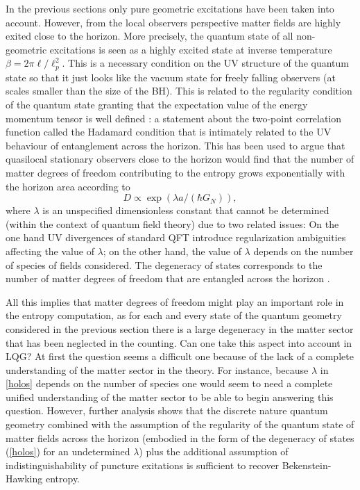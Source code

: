 \documentclass[aps, nofootinbib,superscriptaddress,12pt]{revtex4-2}
\def\be{\begin{equation}}
\def\ee{\end{equation}}
\begin{document}
In the previous sections only pure geometric excitations have been taken into account.
However, from the local observers perspective matter fields are highly exited close to the horizon.
More precisely, the quantum state of all non-geometric excitations is seen as a highly excited state at inverse temperature $\beta=2\pi \ell/\ell_p^2$.  This is a necessary condition on the UV structure of the quantum state so that it just looks like the vacuum state  for freely falling observers (at scales smaller than the size of the BH). This is related to the regularity condition of the quantum state granting that the expectation value of the energy momentum tensor is well defined \cite{Wald:1995yp}: a statement about the two-point correlation function called the Hadamard condition that is intimately related to the UV behaviour of entanglement across the horizon.  This has been used to argue \cite{tHooft:1984kcu} that  quasilocal stationary observers close to the horizon would find that the number of matter degrees of freedom contributing to the entropy grows exponentially with the horizon area according to 
\be\label{holos}
D \propto \exp(\lambda a/(\hbar G_N)),
\ee
where $\lambda$ is an unspecified dimensionless constant that cannot be determined (within the context of quantum field theory) due to two related issues:
On the one hand UV divergences of standard QFT introduce regularization ambiguities affecting the value of $\lambda$; on the other hand, the value of $\lambda$ depends on the number of species of fields considered. The degeneracy of states corresponds to the number of matter degrees of freedom that are entangled across the horizon \cite{Solodukhin:2011gn}. 

All this implies that matter degrees of freedom might play an important role in the entropy computation, as
for each and every state of the quantum geometry considered in the previous section there is a large degeneracy in the matter sector that has been neglected in the counting. Can one take this aspect into account in LQG?
At first the question seems a difficult one because of the lack of a complete understanding of the matter sector in the theory. For instance, because $\lambda$ in \eqref{holos} depends on the number of species one would seem to need a complete unified understanding of the matter sector to be able to begin answering this question.
However, further analysis shows \cite{Ghosh:2013iwa} that the discrete nature quantum geometry combined with the assumption of the regularity of the quantum state of matter fields across the horizon (embodied in the form of the degeneracy of states (\ref{holos}) for an undetermined $\lambda$) plus the additional assumption of indistinguishability of puncture exitations  is sufficient to recover Bekenstein-Hawking entropy.
\end{document}
